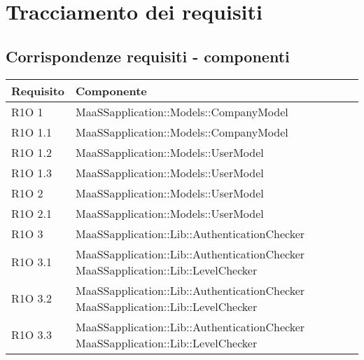 \section{Tracciamento dei requisiti}
\subsection{Corrispondenze requisiti - componenti}
\begin{center}
  \bgroup
  \def\arraystretch{1.8}
  \begin{longtable}{ | l | p{8cm} |}
    \hline
    \cellcolor[gray]{0.9} \textbf{Requisito} & \cellcolor[gray]{0.9} \textbf{Componente} \\ \hline
    
    R1O 1 & MaaSSapplication::Models::CompanyModel \newline  \\ \hline
    
    R1O 1.1 & MaaSSapplication::Models::CompanyModel \newline  \\ \hline
    
    R1O 1.2 & MaaSSapplication::Models::UserModel \newline  \\ \hline
    
    R1O 1.3 & MaaSSapplication::Models::UserModel \newline  \\ \hline
    
    R1O 2 & MaaSSapplication::Models::UserModel \newline  \\ \hline

	R1O 2.1 & MaaSSapplication::Models::UserModel \newline  \\ \hline
	
	R1O 3 & MaaSSapplication::Lib::AuthenticationChecker  \newline  \\ \hline
	
	R1O 3.1 & MaaSSapplication::Lib::AuthenticationChecker \newline MaaSSapplication::Lib::LevelChecker  \\ \hline
	
	R1O 3.2 & MaaSSapplication::Lib::AuthenticationChecker \newline MaaSSapplication::Lib::LevelChecker  \\ \hline
	
	R1O 3.3 & MaaSSapplication::Lib::AuthenticationChecker \newline MaaSSapplication::Lib::LevelChecker  \\ \hline
	

\end{longtable}
\end{center}
